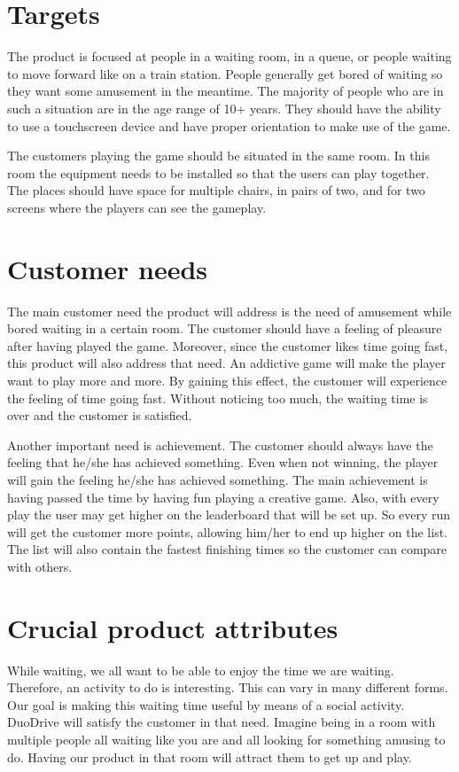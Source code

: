 \documentclass[11pt,twoside,a4paper]{article}
\begin{document}
\section{Targets}
The product is focused at people in a waiting room, in a queue, or people waiting to move forward like on a train station. People generally get bored of waiting so they want some amusement in the meantime. The majority of people who are in such a situation are in the age range of 10+ years. They should have the ability to use a touchscreen device and have proper orientation to make use of the game.

The customers playing the game should be situated in the same room. In this room the equipment needs to be installed so that the users can play together. The places should have space for multiple chairs, in pairs of two, and for two screens where the players can see the gameplay.


\section{Customer needs}
The main customer need the product will address is the need of amusement while bored waiting in a certain room. The customer should have a feeling of pleasure after having played the game. Moreover, since the customer likes time going fast, this product will also address that need. An addictive game will make the player want to play more and more. By gaining this effect, the customer will experience the feeling of time going fast. Without noticing too much, the waiting time is over and the customer is satisfied.

Another important need is achievement. The customer should always have the feeling that he/she has achieved something. Even when not winning, the player will gain the feeling he/she has achieved something. The main achievement is having passed the time by having fun playing a creative game. Also, with every play the user may get higher on the leaderboard that will be set up. So every run will get the customer more points, allowing him/her to end up higher on the list. The list will also contain the fastest finishing times so the customer can compare with others.


\section{Crucial product attributes}
While waiting, we all want to be able to enjoy the time we are waiting. Therefore, an activity to do is interesting. This can vary in many different forms. Our goal is making this waiting time useful by means of a social activity. DuoDrive will satisfy the customer in that need. Imagine being in a room with multiple people all waiting like you are and all looking for something amusing to do. Having our product in that room will attract them to get up and play.
\end{document}
